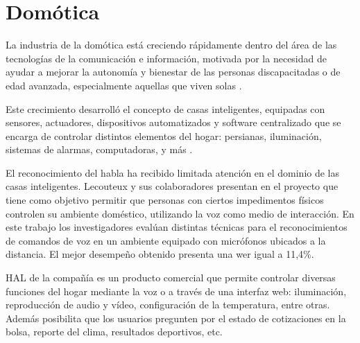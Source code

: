 \section{Dom\'otica}
\label{sec:domotica}

La industria de la dom\'otica est\'a creciendo r\'apidamente dentro del \'area de las tecnolog\'ias de la
comunicaci\'on e informaci\'on, motivada por la necesidad de ayudar a mejorar la autonom\'ia y bienestar 
de las personas discapacitadas o de edad avanzada, especialmente aquellas que viven solas 
\cite{AlshuVoice2011}.

Este crecimiento desarroll\'o el concepto de casas inteligentes, equipadas con sensores, actuadores, 
dispositivos automatizados y software centralizado que se encarga de controlar distintos elementos del 
hogar: persianas, iluminaci\'on, sistemas de alarmas, computadoras, y 
m\'as \cite{LecouteuxSpeech2011, UshaWireless2012}.

El reconocimiento del habla ha recibido limitada atenci\'on en el dominio de las casas inteligentes. 
Lecouteux y sus colaboradores presentan en \cite{LecouteuxSpeech2011} el proyecto  que 
tiene como objetivo permitir que personas con ciertos impedimentos f\'isicos controlen su ambiente 
dom\'estico, utilizando la voz como medio de interacci\'on. En este trabajo los investigadores eval\'uan 
distintas t\'ecnicas para el reconocimientos
de comandos de voz en un ambiente equipado con micr\'ofonos ubicados a la distancia. El mejor desempe\~no 
obtenido presenta una \gls{wer} igual a 11,4\%.

HAL \cite{HAL} de la compa\~n\'ia  es un producto comercial que permite
controlar diversas funciones del hogar mediante la voz o a trav\'es de una interfaz web: 
iluminaci\'on, reproducci\'on de audio y v\'ideo, configuraci\'on de la temperatura, entre otras.
Adem\'as posibilita que los usuarios pregunten por el estado de cotizaciones en la 
bolsa, reporte del clima, resultados deportivos, etc.
